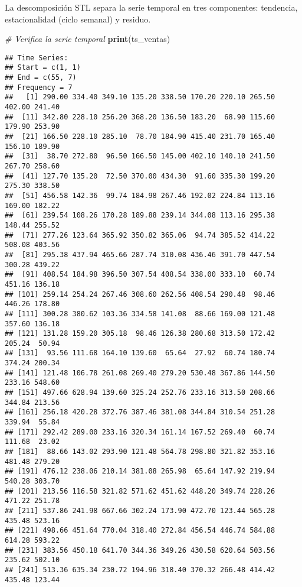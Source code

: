 \documentclass[
]{book}
\newenvironment{Shaded}{\begin{snugshade}}{\end{snugshade}}
\newcommand{\CommentTok}[1]{\textcolor[rgb]{0.56,0.35,0.01}{\textit{#1}}}
\newcommand{\FunctionTok}[1]{\textcolor[rgb]{0.13,0.29,0.53}{\textbf{#1}}}
\newcommand{\NormalTok}[1]{#1}
\begin{document}
La descomposición STL separa la serie temporal en tres componentes: tendencia, estacionalidad (ciclo semanal) y residuo.

\begin{Shaded}
\begin{Highlighting}[]
\CommentTok{\# Verifica la serie temporal}
\FunctionTok{print}\NormalTok{(ts\_ventas)}
\end{Highlighting}
\end{Shaded}

\begin{verbatim}
## Time Series:
## Start = c(1, 1) 
## End = c(55, 7) 
## Frequency = 7 
##   [1] 290.00 334.40 349.10 135.20 338.50 170.20 220.10 265.50 402.00 241.40
##  [11] 342.80 228.10 256.20 368.20 136.50 183.20  68.90 115.60 179.90 253.90
##  [21] 166.50 228.10 285.10  78.70 184.90 415.40 231.70 165.40 156.10 189.90
##  [31]  38.70 272.80  96.50 166.50 145.00 402.10 140.10 241.50 267.70 258.60
##  [41] 127.70 135.20  72.50 370.00 434.30  91.60 335.30 199.20 275.30 338.50
##  [51] 456.58 142.36  99.74 184.98 267.46 192.02 224.84 113.16 169.00 182.22
##  [61] 239.54 108.26 170.28 189.88 239.14 344.08 113.16 295.38 148.44 255.52
##  [71] 277.26 123.64 365.92 350.82 365.06  94.74 385.52 414.22 508.08 403.56
##  [81] 295.38 437.94 465.66 287.74 310.08 436.46 391.70 447.54 300.28 439.22
##  [91] 408.54 184.98 396.50 307.54 408.54 338.00 333.10  60.74 451.16 136.18
## [101] 259.14 254.24 267.46 308.60 262.56 408.54 290.48  98.46 446.26 178.80
## [111] 300.28 380.62 103.36 334.58 141.08  88.66 169.00 121.48 357.60 136.18
## [121] 131.28 159.20 305.18  98.46 126.38 280.68 313.50 172.42 205.24  50.94
## [131]  93.56 111.68 164.10 139.60  65.64  27.92  60.74 180.74 374.24 200.34
## [141] 121.48 106.78 261.08 269.40 279.20 530.48 367.86 144.50 233.16 548.60
## [151] 497.66 628.94 139.60 325.24 252.76 233.16 313.50 208.66 344.84 213.56
## [161] 256.18 420.28 372.76 387.46 381.08 344.84 310.54 251.28 339.94  55.84
## [171] 292.42 289.00 233.16 320.34 161.14 167.52 269.40  60.74 111.68  23.02
## [181]  88.66 143.02 293.90 121.48 564.78 298.80 321.82 353.16 481.48 279.20
## [191] 476.12 238.06 210.14 381.08 265.98  65.64 147.92 219.94 540.28 303.70
## [201] 213.56 116.58 321.82 571.62 451.62 448.20 349.74 228.26 471.22 251.78
## [211] 537.86 241.98 667.66 302.24 173.90 472.70 123.44 565.28 435.48 523.16
## [221] 498.66 451.64 770.04 318.40 272.84 456.54 446.74 584.88 614.28 593.22
## [231] 383.56 450.18 641.70 344.36 349.26 430.58 620.64 503.56 235.62 502.10
## [241] 513.36 635.34 230.72 194.96 318.40 370.32 266.48 414.42 435.48 123.44

\end{verbatim}
\end{document}
